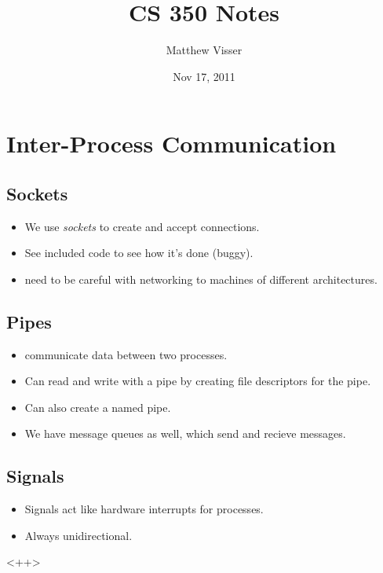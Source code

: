 \documentclass[12pt]{article}
\begin{document}
\title{CS 350 Notes}
\author{Matthew Visser}
\date{Nov 17, 2011}
\maketitle

\section{Inter-Process Communication}

\subsection{Sockets}

\begin{itemize}
	\item We use \emph{sockets} to create and accept connections.
	\item See included code to see how it's done (buggy).
	\item need to be careful with networking to machines of different
		architectures.
\end{itemize}

\subsection{Pipes}

\begin{itemize}
	\item communicate data between two processes.
	\item Can read and write with a pipe by creating file descriptors for the
		pipe.
	\item Can also create a named pipe.
	\item We have message queues as well, which send and recieve messages.
\end{itemize}

\subsection{Signals}

\begin{itemize}
	\item Signals act like hardware interrupts for processes.
	\item Always unidirectional.
\end{itemize}<++>
\end{document}
